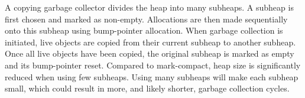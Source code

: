 A copying garbage collector divides the heap into many subheaps. A subheap is first chosen and marked as non-empty. Allocations are then made sequentially onto this subheap using bump-pointer allocation. When garbage collection is initiated, live objects are copied from their current subheap to another subheap. Once all live objects have been copied, the original subheap is marked as empty and its bump-pointer reset. Compared to mark-compact, heap size is significantly reduced when using few subheaps. Using many subheaps will make each subheap small, which could result in more, and likely shorter, garbage collection cycles.

